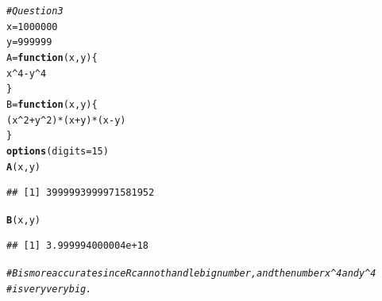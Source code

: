 \documentclass{article}\usepackage[]{graphicx}\usepackage[]{xcolor}
\makeatletter
\newcommand{\hlnum}[1]{\textcolor[rgb]{0.686,0.059,0.569}{#1}}%
\newcommand{\hlcom}[1]{\textcolor[rgb]{0.678,0.584,0.686}{\textit{#1}}}%
\newcommand{\hlopt}[1]{\textcolor[rgb]{0,0,0}{#1}}%
\newcommand{\hlstd}[1]{\textcolor[rgb]{0.345,0.345,0.345}{#1}}%
\newcommand{\hlkwa}[1]{\textcolor[rgb]{0.161,0.373,0.58}{\textbf{#1}}}%
\newcommand{\hlkwb}[1]{\textcolor[rgb]{0.69,0.353,0.396}{#1}}%
\newcommand{\hlkwc}[1]{\textcolor[rgb]{0.333,0.667,0.333}{#1}}%
\newcommand{\hlkwd}[1]{\textcolor[rgb]{0.737,0.353,0.396}{\textbf{#1}}}%
\newenvironment{kframe}{%
 \def\at@end@of@kframe{}%
 \ifinner\ifhmode%
  \def\at@end@of@kframe{\end{minipage}}%
  \begin{minipage}{\columnwidth}%
 \fi\fi%
 \def\FrameCommand##1{\hskip\@totalleftmargin \hskip-\fboxsep
 \colorbox{shadecolor}{##1}\hskip-\fboxsep
     \hskip-\linewidth \hskip-\@totalleftmargin \hskip\columnwidth}%
 \MakeFramed {\advance\hsize-\width
   \@totalleftmargin\z@ \linewidth\hsize
   \@setminipage}}%
 {\par\unskip\endMakeFramed%
 \at@end@of@kframe}
\newenvironment{knitrout}{}{} %
\makeatother
\begin{document}
\begin{knitrout}
\begin{kframe}
\begin{alltt}
\hlcom{# Question 3}
\hlstd{x} \hlkwb{=} \hlnum{1000000}
\hlstd{y} \hlkwb{=} \hlnum{999999}
\hlstd{A} \hlkwb{=} \hlkwa{function}\hlstd{(}\hlkwc{x}\hlstd{,}\hlkwc{y}\hlstd{)\{}
  \hlstd{x}\hlopt{^}\hlnum{4} \hlopt{-} \hlstd{y}\hlopt{^}\hlnum{4}
\hlstd{\}}
\hlstd{B} \hlkwb{=} \hlkwa{function}\hlstd{(}\hlkwc{x}\hlstd{,}\hlkwc{y}\hlstd{)\{}
  \hlstd{(x}\hlopt{^}\hlnum{2}\hlopt{+}\hlstd{y}\hlopt{^}\hlnum{2}\hlstd{)}\hlopt{*}\hlstd{(x}\hlopt{+}\hlstd{y)}\hlopt{*}\hlstd{(x}\hlopt{-}\hlstd{y)}
\hlstd{\}}
\hlkwd{options}\hlstd{(}\hlkwc{digits}\hlstd{=}\hlnum{15}\hlstd{)}
\hlkwd{A}\hlstd{(x,y)}
\end{alltt}
\begin{verbatim}
## [1] 3999993999971581952
\end{verbatim}
\begin{alltt}
\hlkwd{B}\hlstd{(x,y)}
\end{alltt}
\begin{verbatim}
## [1] 3.999994000004e+18
\end{verbatim}
\begin{alltt}
\hlcom{# B is more accurate since R cannot handle big number, and the number x^4 and y^4}
\hlcom{# is very very big.}


\end{alltt}
\end{kframe}
\end{knitrout}
\end{document}
